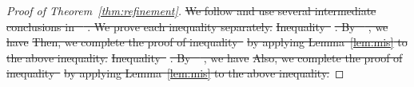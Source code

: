 \documentclass[lettersize,onecolumn,journal]{IEEEtran}
\theoremstyle{definition}
\theoremstyle{definition}
\providecommand{\DIFdeltex}[1]{{\protect\color{red}\sout{#1}}}                      %
\providecommand{\DIFdel}[1]{\texorpdfstring{\DIFdeltex{#1}}{}} %
\begin{document}
\begin{proof}[Proof of Theorem~\ref{thm:refinement}]
\DIFdel{We follow and use several intermediate conclusions in \mbox{%
\citet[Proof of Lemma 5]{han2020exact}}\hspace{0pt}%
. We prove each inequality separately.
    }%
\DIFdel{Inequality~}%
\DIFdel{. By \mbox{%
\citet[Proof of Lemma 5]{han2020exact}}\hspace{0pt}%
, we have 
    }%
\DIFdel{Then, we complete the proof of inequality~}%
\DIFdel{by applying Lemma~\ref{lem:mis} to the above inequality.
    }%
\DIFdel{Inequality~}%
\DIFdel{. By \mbox{%
\citet[Proof of Lemma 5]{han2020exact}}\hspace{0pt}%
, we have 
    }%
\DIFdel{Also, we complete the proof of inequality~}%
\DIFdel{by applying Lemma~\ref{lem:mis} to the above inequality.
    }%


\end{proof}
\end{document}
